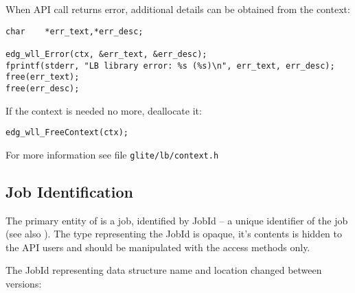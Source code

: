 
When \LB API call returns error, additional details can be obtained
from the context:
\begin{lstlisting}
char    *err_text,*err_desc;
        
edg_wll_Error(ctx, &err_text, &err_desc);
fprintf(stderr, "LB library error: %s (%s)\n", err_text, err_desc);
free(err_text);
free(err_desc);
\end{lstlisting}

If the context is needed no more, deallocate it:
\begin{lstlisting}
edg_wll_FreeContext(ctx);
\end{lstlisting}

For more information see file \texttt{glite/lb/context.h}

\subsection{Job Identification} 
The primary entity of \LB is a job, identified by JobId -- a unique
identifier of the job (see also \cite{lbug}). The type representing
the JobId is opaque, it's contents is hidden to the API users and
should be manipulated with the access methods only.

The JobId representing data structure name and location
changed between \LB versions:

